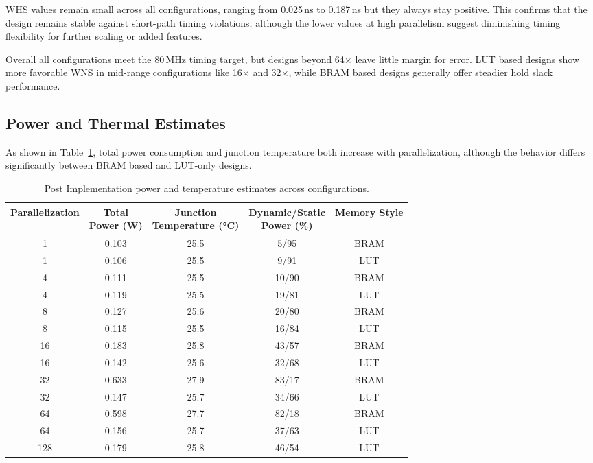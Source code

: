 \documentclass[a4paper,12pt]{report}
\begin{document}
WHS values remain small across all configurations, ranging from 0.025\,ns to 0.187\,ns but they always stay positive. This confirms that the design remains stable against short-path timing violations, although the lower values at high parallelism suggest diminishing timing flexibility for further scaling or added features.

Overall all configurations meet the 80\,MHz timing target, but designs beyond 64$\times$ leave little margin for error. LUT based designs show more favorable WNS in mid-range configurations like 16$\times$ and 32$\times$, while BRAM based designs generally offer steadier hold slack performance.

\subsection{Power and Thermal Estimates}
As shown in Table~\ref{table:thermal_comparison}, total power consumption and junction temperature both increase with parallelization, although the behavior differs significantly between BRAM based and LUT-only designs.
\begin{table}[H]
\centering
\renewcommand{\arraystretch}{1.2}
\begin{tabular}{|c|c|c|c|c|}
\hline
\textbf{Parallelization} & \makecell{\textbf{Total} \\ \textbf{Power (W)}} & \makecell{\textbf{Junction} \\ \textbf{Temperature (°C)}} & \makecell{\textbf{Dynamic/Static} \\ \textbf{Power (\%)}} & \textbf{Memory Style} \\
    \hline
    1   & 0.103 & 25.5 & 5/95 & BRAM \\
    \hline
    1   & 0.106 & 25.5 & 9/91 & LUT \\
    \hline
    4   & 0.111 & 25.5 & 10/90 & BRAM \\
    \hline
    4   & 0.119 & 25.5 & 19/81 & LUT \\
    \hline
    8   & 0.127 & 25.6 & 20/80 & BRAM \\
    \hline
    8   & 0.115 & 25.5 & 16/84 & LUT \\
    \hline
    16  & 0.183 & 25.8 & 43/57 & BRAM \\
    \hline
    16  & 0.142 & 25.6 & 32/68 & LUT \\
    \hline
    32  & 0.633 & 27.9 & 83/17 & BRAM \\
    \hline
    32  & 0.147 & 25.7 & 34/66 & LUT \\
    \hline
    64  & 0.598 & 27.7 & 82/18 & BRAM \\
    \hline
    64  & 0.156 & 25.7 & 37/63 & LUT \\
    \hline
    128 & 0.179 & 25.8 & 46/54 & LUT \\
    \hline
\end{tabular}
\vspace{1em}
\caption{Post Implementation power and temperature estimates across configurations.}
\label{table:thermal_comparison}
\end{table}
\end{document}
